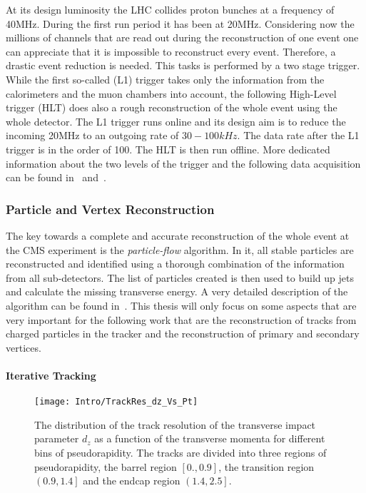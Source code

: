 At its design luminosity the LHC collides proton bunches at a frequency of 40\unit{MHz}. During the first run period it has been at 20\unit{MHz}. Considering now the millions of channels that are read out during the reconstruction of one event one can appreciate that it is impossible to reconstruct every event. Therefore, a drastic event reduction is needed. This tasks is performed by a two stage trigger. While the first so-called \Lone{} (L1) trigger takes only the information from the calorimeters and the muon chambers into account, the following High-Level trigger (HLT) does also a rough reconstruction of the whole event using the whole detector. The L1 trigger runs online and its design aim is to reduce the incoming 20\unit{MHz} to an outgoing rate of $30-100\unit{kHz}$. The data rate after the L1 trigger is in the order of 100\GBytes{}. The HLT is then run offline. More dedicated information about the two levels of the trigger and the following data acquisition can be found in~ and~.

\subsubsection{Particle and Vertex Reconstruction \label{sec:LHCCMSPaVR}}

The key towards a complete and accurate reconstruction of the whole event at the CMS experiment is the \textit{particle-flow} algorithm. In it, all stable particles are reconstructed and identified using a thorough combination of the information from all sub-detectors. The list of particles created is then used to build up jets and calculate the missing transverse energy. A very detailed description of the algorithm can be found in~. This thesis will only focus on some aspects that are very important for the following work that are the reconstruction of tracks from charged particles in the tracker and the reconstruction of primary and secondary vertices.

\paragraph*{Iterative Tracking}

\begin{figure}[Ht]
    \centering
    \texttt{[image: Intro/TrackRes\_dz\_Vs\_Pt]}
    \caption[Track resolution \vs pseudorapidity for different bins of transverse momentum]{The distribution of the track resolution of the transverse impact parameter $d_{z}$ as a function of the transverse momenta for different bins of pseudorapidity. The tracks are divided into three regions of pseudorapidity, the barrel region $\left[0., 0.9\right]$, the transition region $\left(0.9, 1.4\right]$ and the endcap region $\left(1.4, 2.5\right]$. \label{plot:IntroTrackRes}}
\end{figure}

